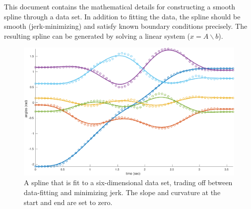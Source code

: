 This document contains the mathematical details for constructing a smooth spline through a data set.
In addition to fitting the data, the spline should be smooth (jerk-minimizing) and satisfy known boundary conditions precisely.
The resulting spline can be generated by solving a linear system ($x = A \backslash b$).

\begin{figure}[ht]
	\centering
  \includegraphics[width=\textwidth]{fig/DataFittingExampleFigure.pdf}
  \caption{A spline that is fit to a six-dimensional data set, trading off between data-fitting and
           minimizing jerk. The slope and curvature at the start and end are set to zero.}
  \label{fig:DataFittingExampleFigure}
\end{figure}

\newpage
